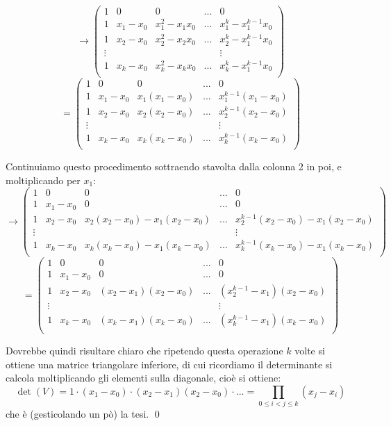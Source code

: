 \documentclass[a4paper,11pt]{article}
\begin{document}
$$
\rightarrow
\begin{pmatrix}
	1 & 0 & 0 & ... & 0 \\
	1 & x_1 - x_0 & x_1^2 - x_1x_0 & ... & x_1^k - x_1^{k - 1} x_0 \\
	1 & x_2 - x_0 & x_2^2 - x_2x_0 & ... & x_2^k - x_1^{k - 1} x_0 \\
	\vdots & & & & \vdots \\
	1 & x_k - x_0 & x_k^2 - x_k x_0 & ... & x_k^k - x_1^{k - 1} x_0 \\
\end{pmatrix}
$$
$$
=
\begin{pmatrix}
	1 & 0 & 0 & ... & 0 \\
	1 & x_1 - x_0 & x_1(x_1 - x_0) & ... & x_1^{k - 1} (x_1 - x_0) \\
	1 & x_2 - x_0 & x_2(x_2 - x_0) & ... & x_2^{k - 1} (x_2 - x_0) \\
	\vdots & & & & \vdots \\
	1 & x_k - x_0 & x_k(x_k - x_0) & ... & x_k^{k - 1} (x_k - x_0) \\
\end{pmatrix}
$$

Continuiamo questo procedimento sottraendo stavolta dalla colonna 2 in poi, e moltiplicando per $x_1$:
$$
\rightarrow
\begin{pmatrix}
	1 & 0 & 0 & ... & 0 \\
	1 & x_1 - x_0 & 0  & ... & 0 \\
	1 & x_2 - x_0 & x_2(x_2 - x_0) - x_1(x_2 - x_0) & ... & x_2^{k - 1} (x_2 - x_0) - x_1 (x_2 - x_0) \\
	\vdots & & & & \vdots \\
	1 & x_k - x_0 & x_k(x_k - x_0) - x_1 (x_k - x_0) & ... & x_k^{k - 1} (x_k - x_0) - x_1 (x_k - x_0) \\
\end{pmatrix}
$$
$$
=
\begin{pmatrix}
	1 & 0 & 0 & ... & 0 \\
	1 & x_1 - x_0 & 0 & ... & 0 \\
	1 & x_2 - x_0 & (x_2 - x_1)(x_2 - x_0) & ... & (x_2^{k - 1} - x_1) (x_2 - x_0) \\
	\vdots & & & & \vdots \\
	1 & x_k - x_0 & (x_k - x_1) (x_k - x_0) & ... & (x_k^{k - 1} - x_1) (x_k - x_0) \\
\end{pmatrix}
$$

Dovrebbe quindi risultare chiaro che ripetendo questa operazione $k$ volte si ottiene una matrice triangolare inferiore, di cui ricordiamo il determinante si calcola moltiplicando gli elementi sulla diagonale, cioè si ottiene:
$$
\det(V) = 1 \cdot (x_1 - x_0) \cdot (x_2 - x_1) (x_2 - x_0) \cdot ... = \prod_{0 \leq i < j \leq k} (x_j - x_i)
$$
che è (gesticolando un pò) la tesi. \qed
\end{document}
